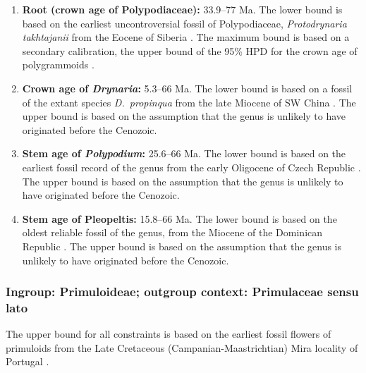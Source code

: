 \begin{enumerate}
\item \textbf{Root (crown age of Polypodiaceae):} 33.9--77 Ma. The
  lower bound is based on the earliest uncontroversial fossil of
  Polypodiaceae, \textit{Protodrynaria takhtajanii} from the Eocene of
  Siberia \citep{Vikulin1987}. The maximum bound is based on a
  secondary calibration, the upper bound of the 95\% HPD for the crown
  age of polygrammoids \citep{Schuettpelz2009}.

\item \textbf{Crown age of \textit{Drynaria}:} 5.3--66 Ma. The lower
  bound is based on a fossil of the extant species
  \textit{D.~propinqua} from the late Miocene of SW China
  \citep{Wen2013}. The upper bound is based on the assumption that the
  genus is unlikely to have originated before the Cenozoic.

\item \textbf{Stem age of \textit{Polypodium}:} 25.6--66 Ma. The
  lower bound is based on the earliest fossil record of the genus
  from the early Oligocene of Czech Republic \citep{Kvacek2001}. The
  upper bound is based on the assumption that the genus is unlikely to
  have originated before the Cenozoic.

\item \textbf{Stem age of Pleopeltis:} 15.8--66 Ma. The lower bound
  is based on the oldest reliable fossil of the genus, from the
  Miocene of the Dominican Republic \citep{Schneider2015}. The upper
  bound is based on the assumption that the genus is unlikely to have
  originated before the Cenozoic.
\end{enumerate}

\subsubsection*{Ingroup: Primuloideae; outgroup context: Primulaceae
  sensu lato}


The upper bound for all constraints is based on the earliest fossil
flowers of {\color{red}primuloids} from the Late Cretaceous
(Campanian-Maastrichtian) Mira locality of Portugal \citep{Friis2011}.


